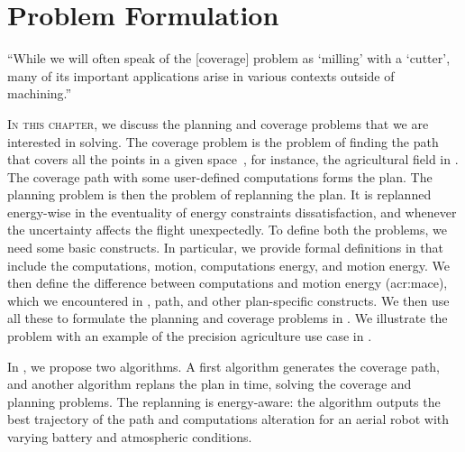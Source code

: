 
%
%
%
%
\chapter{Problem Formulation}
\label{cp:pb}

\begin{chapquote}{\cite{arkin2001optimal}}
  ``While we will often speak of the [coverage] problem as `milling' with a `cutter', many of its important applications arise in various contexts outside of machining.''
\end{chapquote}

\vspace*{1em}

\lettrine{I}{n this chapter}, we discuss the planning and coverage problems that we are interested in solving. The coverage problem is the problem of finding the path that covers all the points in a given space~\citep{choset2001coverage,galceran2013survey}, for instance, the agricultural field in . The coverage path with some user-defined computations forms the plan. The planning problem is then the problem of replanning the plan. It is replanned energy-wise in the eventuality of energy constraints dissatisfaction, and whenever the uncertainty affects the flight unexpectedly. To define both the problems, we need some basic constructs. In particular, we provide formal definitions in  that include the computations, motion, computations energy, and motion energy. We then define the difference between computations and motion energy (\Gls{acr:mace}), which we encountered in , path, and other plan-specific constructs. We then use all these to formulate the planning and coverage problems in . We illustrate the problem with an example of the precision agriculture use case in .

In , we propose two algorithms. A first algorithm generates the coverage path, and another algorithm replans the plan in time, solving the coverage and planning problems. The replanning is energy-aware: the algorithm outputs the best trajectory of the path and computations alteration for an aerial robot with varying battery and atmospheric conditions. 

